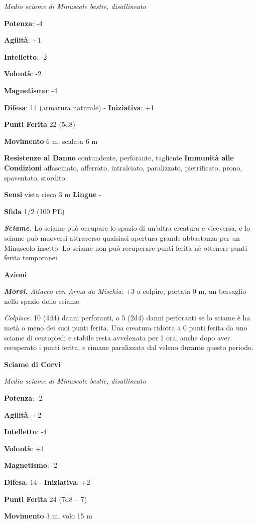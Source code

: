 \begin{multicols}{2}
\emph{Medio sciame di Minuscole bestie, disallineato}

\textbf{Potenza}: -4

\textbf{Agilità}: +1

\textbf{Intelletto}: -2

\textbf{Volontà}: -2

\textbf{Magnetismo}: -4

\textbf{Difesa}: 14 (armatura naturale) - \textbf{Iniziativa}: +1

\textbf{Punti Ferita} 22 (5d8)

\textbf{Movimento} 6 m, scalata 6 m

\textbf{Resistenze al Danno} contundente, perforante, tagliente
\textbf{Immunità alle Condizioni} affascinato, afferrato, intralciato,
paralizzato, pietrificato, prono, spaventato, stordito

\textbf{Sensi} vista cieca 3 m \textbf{Lingue} -

\textbf{Sfida} 1/2 (100 PE)

\emph{\textbf{Sciame.}} Lo sciame può occupare lo spazio di un'altra
creatura e viceversa, e lo sciame può muoversi attraverso qualsiasi
apertura grande abbastanza per un Minuscolo insetto. Lo sciame non può
recuperare punti ferita né ottenere punti ferita temporanei.

\textbf{Azioni}

\emph{\textbf{Morsi.} Attacco con Arma da Mischia}: +3 a colpire,
portata 0 m, un bersaglio nello spazio dello sciame.

\emph{Colpisce:} 10 (4d4) danni perforanti, o 5 (2d4) danni perforanti
se lo sciame è ha metà o meno dei suoi punti ferita. Una creatura
ridotta a 0 punti ferita da uno sciame di centopiedi e stabile resta
avvelenata per 1 ora, anche dopo aver recuperato i punti ferita, e
rimane paralizzata dal veleno durante questo periodo.

\textbf{Sciame di Corvi}

\emph{Medio sciame di Minuscole bestie, disallineato}

\textbf{Potenza}: -2

\textbf{Agilità}: +2

\textbf{Intelletto}: -4

\textbf{Volontà}: +1

\textbf{Magnetismo}: -2

\textbf{Difesa}: 14 - \textbf{Iniziativa}: +2

\textbf{Punti Ferita} 24 (7d8 -- 7)

\textbf{Movimento} 3 m, volo 15 m


\end{multicols}

